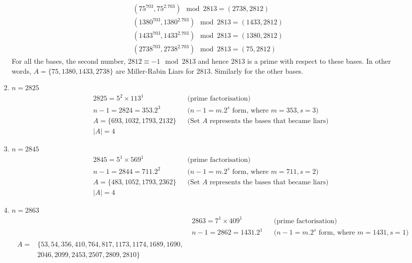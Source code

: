 \documentclass[11pt,a4paper]{article}
\begin{document}
\begin{enumerate}[1.]
\begin{enumerate}[3.]
\begin{flushleft}
\begin{enumerate}[1.]
				\begin{align}
					(75^{703}, 75^{2.703})\mod 2813 = (2738, 2812)\\
					(1380^{703}, 1380^{2.703})\mod 2813 = (1433, 2812)\\
					(1433^{703}, 1433^{2.703})\mod 2813 = (1380, 2812)\\
					(2738^{703}, 2738^{2.703})\mod 2813 = (75, 2812)
				\end{align}
				For all the bases, the second number, $2812 \equiv -1 \mod 2813$ and hence $2813$ is a prime with respect to these bases. In other words, $A = \{75, 1380, 1433, 2738\}$ are Miller-Rabin Liars for $2813$. Similarly for the other bases. 
				\medbreak
				\item $n = 2825$
				\begin{align}
					& 2825 = 5^2 \times 113^1 &&\text{(prime factorisation)}\nonumber\\
					& n - 1 = 2824 = 353.2^3 &&\text{($n - 1 = m.2^s$ form, where $m = 353, s = 3$)}\nonumber\\
					& A = \{693, 1032, 1793, 2132\}&&\text{(Set $A$ represents the bases that became liars)} \nonumber\\
					& |A| = 4 \nonumber
				\end{align}
				\item $n = 2845$
				\begin{align}
					& 2845 = 5^1 \times 569^1 &&\text{(prime factorisation)}\nonumber\\
					& n - 1 = 2844 = 711.2^2 &&\text{($n - 1 = m.2^s$ form, where $m = 711, s = 2$)}\nonumber\\
					& A = \{483, 1052, 1793, 2362\}&&\text{(Set $A$ represents the bases that became liars)} \nonumber\\
					& |A| = 4 \nonumber
				\end{align}
				\item $n = 2863$
				\begin{align}
					& 2863 = 7^1 \times 409^1 &&\text{(prime factorisation)}\nonumber\\
					& n - 1 = 2862 = 1431.2^1 &&\text{($n - 1 = m.2^s$ form, where $m = 1431, s = 1$)}\nonumber\\
					\begin{split}
						A = &\{53, 54, 356, 410, 764, 817, 1173, 1174, 1689, 1690, \\
						&2046, 2099, 2453, 2507, 2809, 2810\} \nonumber\\
					\end{split}\\

\end{align}
\end{enumerate}
\end{flushleft}
\end{enumerate}
\end{enumerate}
\end{document}
